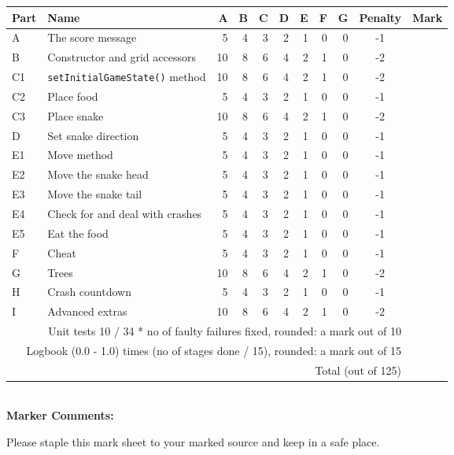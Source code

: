 \begin{tabular}{|l|l|r|r|r|r|r|r|r|c|p{0.5in}|}
\hline
Part&Name&A&B&C&D&E&F&G&Penalty & Mark \\
\hline
\hline
A &The score message                         & 5& 4& 3& 2& 1&0&0&-1 &\\ \hline
B &Constructor and grid accessors            &10& 8& 6& 4& 2&1&0&-2 &\\ \hline
C1&\texttt{setInitialGameState()} method     &10& 8& 6& 4& 2&1&0&-2 &\\ \hline
C2&Place food                                & 5& 4& 3& 2& 1&0&0&-1 &\\ \hline
C3&Place snake                               &10& 8& 6& 4& 2&1&0&-2 &\\ \hline
D &Set snake direction                       & 5& 4& 3& 2& 1&0&0&-1 &\\ \hline
E1&Move method                               & 5& 4& 3& 2& 1&0&0&-1 &\\ \hline
E2&Move the snake head                       & 5& 4& 3& 2& 1&0&0&-1 &\\ \hline
E3&Move the snake tail                       & 5& 4& 3& 2& 1&0&0&-1 &\\ \hline
E4&Check for and deal with crashes           & 5& 4& 3& 2& 1&0&0&-1 &\\ \hline
E5&Eat the food                              & 5& 4& 3& 2& 1&0&0&-1 &\\ \hline
F &Cheat                                     & 5& 4& 3& 2& 1&0&0&-1 &\\ \hline
G &Trees                                     &10& 8& 6& 4& 2&1&0&-2 &\\ \hline
H &Crash countdown                           & 5& 4& 3& 2& 1&0&0&-1 &\\ \hline
I &Advanced extras                           &10& 8& 6& 4& 2&1&0&-2 &\\ \hline
\hline
\multicolumn{10}{|r|}{Unit tests 10 / 34 * no of faulty failures fixed, rounded: a mark out of 10}  &\\ \hline
\multicolumn{10}{|r|}{Logbook (0.0 - 1.0) times (no of stages done / 15), rounded: a mark out of 15}  &\\ \hline
\hline
\multicolumn{10}{|r|}{Total (out of 125)}  &\\ \hline

\end{tabular}
\\[0.2in]
\Large
\textbf{Marker Comments:}
\vspace{0.2in}

\normalsize
\vfill
Please staple this mark sheet to your marked source and keep
in a safe place.

